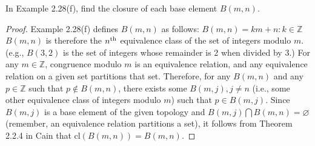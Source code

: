 
\setcounter{question}{24} %
\begin{question}[Macula]

In Example 2.28(f), find the closure of each base element $B(m, n)$.

\end{question}

\begin{proof}
Example 2.28(f) defines $B(m, n)$ as follows:
\bigbreak
$B(m, n) = {km + n : k \in \mathbb{Z}}$
\bigbreak
$B(m, n)$ is therefore the $n\textsuperscript {th}$ equivalence class of the set of integers modulo $m$. (e.g., $B(3, 2)$ is the set of integers whose remainder is 2 when divided by 3.) For any $m \in \mathbb{Z}$, congruence modulo $m$ is an equivalence relation, and any equivalence relation on a given set partitions that set. Therefore, for any $B(m, n)$ and any $p \in \mathbb{Z}$ such that $p \notin B(m, n)$, there exists some $B(m, j), j \neq n$ (i.e., some other equivalence class of integers modulo $m$) such that $p \in B(m, j)$. Since $B(m, j)$ is a base element of the given topology and $B(m, j) \bigcap B(m, n) = \varnothing$ (remember, an equivalence relation partitions a set), it follows from Theorem 2.2.4 in Cain that cl$(B(m, n)) = B(m, n)$. 


\end{proof}

